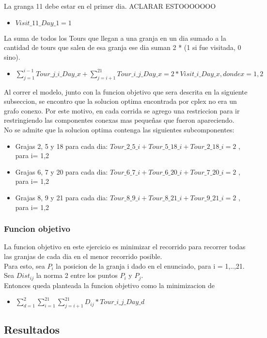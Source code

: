 La granga 11 debe estar en el primer dia. ACLARAR ESTOOOOOOO \\
\begin{itemize}
\item $ Visit\_11\_Day\_1 = 1$ \\
\end{itemize}

La suma de todos los Tours que llegan a una granja en un dia sumado a la cantidad de tours que salen de esa granja ese dia suman 2 * (1 si fue visitada, 0 sino).

\begin{itemize}
\item $ \sum_{j = 1}^{i-1} Tour\_j\_i\_Day\_x + \sum_{j=i+1}^{21} Tour\_i\_j\_Day\_x = 2 * Visit\_i\_Day\_x            , donde	x = 1,2 $\\
\end{itemize}

Al correr el modelo, junto con la funcion objetivo que sera descrita en la siguiente subseccion, se encontro que la solucion optima encontrada por cplex no era un grafo conexo. Por este motivo, en cada corrida se agrego una restriccion para ir restringiendo las componentes conexas mas peque\~nas que fueron apareciendo. \\

No se admite que la solucion optima contenga las siguientes subcomponentes: \\
\begin{itemize}
\item Grajas 2, 5 y 18 para cada dia: $Tour\_2\_5\_i + Tour\_5\_18\_i + Tour\_2\_18\_i = 2$ , para i= 1,2\\
\item Grajas 6, 7 y 20 para cada dia: $Tour\_6\_7\_i + Tour\_6\_20\_i + Tour\_7\_20\_i = 2$ , para i= 1,2\\
\item Grajas 8, 9 y 21 para cada dia: $Tour\_8\_9\_i + Tour\_8\_21\_i + Tour\_9\_21\_i = 2$ , para i= 1,2\\
\end{itemize}

\subsubsection{Funcion objetivo}

La funcion objetivo en este ejercicio es minimizar el recorrido para recorrer todas las granjas de cada dia en el menor recorrido posible.\\
Para esto, sea $P_i$ la posicion de la granja i dado en el enunciado, para i = 1,..,21. \\
Sea $Dist_{ij}$ la norma 2 entre los puntos $P_i$ y $P_j$. \\
Entonces queda planteada la funcion objetivo como la minimizacion de \\

\begin{itemize}
\item $ \sum_{d=1}^{2} \sum_{i=1}^{21} \sum_{j=i+1}^{21} D_{ij} * Tour\_i\_j\_Day\_d $ \\
\end{itemize}

\subsection{Resultados}
